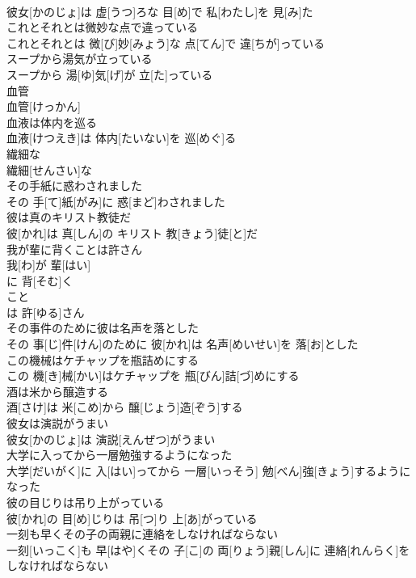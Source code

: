 \documentclass[8pt]{extreport}
\begin{document}
\begin{CJK}{UTF8}{min}
\\	彼女[かのじょ]は 虚[うつ]ろな 目[め]で 私[わたし]を 見[み]た
\\	これとそれとは微妙な点で違っている	
\\	これとそれとは 微[び]妙[みょう]な 点[てん]で 違[ちが]っている
\\	スープから湯気が立っている	
\\	スープから 湯[ゆ]気[げ]が 立[た]っている
\\	血管	
\\	血管[けっかん]
\\	血液は体内を巡る	
\\	血液[けつえき]は 体内[たいない]を 巡[めぐ]る
\\	繊細な	
\\	繊細[せんさい]な
\\	その手紙に惑わされました	
\\	その 手[て]紙[がみ]に 惑[まど]わされました
\\	彼は真のキリスト教徒だ	
\\	彼[かれ]は 真[しん]の キリスト 教[きょう]徒[と]だ
\\	我が輩に背くことは許さん	
\\	我[わ]が 輩[はい]
\\	に 背[そむ]く 
\\	こと 
\\	は 許[ゆる]さん 
\\	その事件のために彼は名声を落とした	
\\	その 事[じ]件[けん]のために 彼[かれ]は 名声[めいせい]を 落[お]とした
\\	この機械はケチャップを瓶詰めにする	
\\	この 機[き]械[かい]はケチャップを 瓶[びん]詰[づ]めにする
\\	酒は米から醸造する	
\\	酒[さけ]は 米[こめ]から 醸[じょう]造[ぞう]する
\\	彼女は演説がうまい	
\\	彼女[かのじょ]は 演説[えんぜつ]がうまい
\\	大学に入ってから一層勉強するようになった	
\\	大学[だいがく]に 入[はい]ってから 一層[いっそう] 勉[べん]強[きょう]するようになった
\\	彼の目じりは吊り上がっている	
\\	彼[かれ]の 目[め]じりは 吊[つ]り 上[あ]がっている
\\	一刻も早くその子の両親に連絡をしなければならない	
\\	一刻[いっこく]も 早[はや]くその 子[こ]の 両[りょう]親[しん]に 連絡[れんらく]をしなければならない

\end{CJK}
\end{document}
